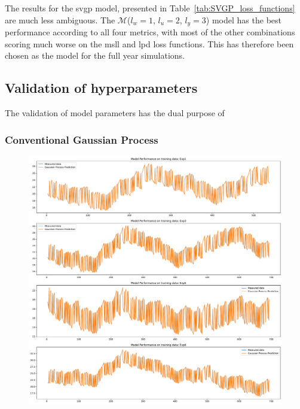 The results for the \acrshort{svgp} model, presented in
Table~\ref{tab:SVGP_loss_functions} are much less ambiguous. The
$\mathcal{M}$($l_w = 1$, $l_u = 2$, $l_y = 3$) model has the best performance
according to all four metrics, with most of the other combinations scoring much
worse on the \acrshort{msll} and \acrshort{lpd} loss functions. This has
therefore been chosen as the model for the full year simulations.


\subsection{Validation of hyperparameters}


The validation of model parameters has the dual purpose of 


\subsubsection{Conventional Gaussian Process}

\begin{figure}[ht]
    \centering
    \includegraphics[width = \textwidth]{Plots/GP_113_training_performance.pdf}
    \caption{}
    \label{fig:GP_train_validation}
\end{figure}

